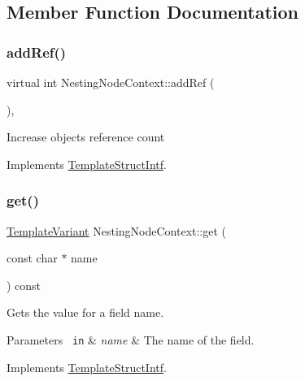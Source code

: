 \subsection{Member Function Documentation}
\mbox{\label{class_nesting_node_context_a4cd533625e9feace6c41d8191da089c4}} 
\subsubsection{\texorpdfstring{addRef()}{addRef()}}
{\footnotesize\ttfamily virtual int Nesting\+Node\+Context\+::add\+Ref (\begin{DoxyParamCaption}{ }\end{DoxyParamCaption})\hspace{0.3cm}{\ttfamily [inline]}, {\ttfamily [virtual]}}

Increase object\textquotesingle{}s reference count 

Implements \mbox{\hyperlink{class_template_struct_intf_a05fe97ad47633beb326f69686faed581}{Template\+Struct\+Intf}}.

\mbox{\label{class_nesting_node_context_a7845a1aab178cdb02172738a864854ce}} 
\subsubsection{\texorpdfstring{get()}{get()}}
{\footnotesize\ttfamily \mbox{\hyperlink{class_template_variant}{Template\+Variant}} Nesting\+Node\+Context\+::get (\begin{DoxyParamCaption}\item[{const char $\ast$}]{name }\end{DoxyParamCaption}) const\hspace{0.3cm}{\ttfamily [virtual]}}

Gets the value for a field name. 
\begin{DoxyParams}[1]{Parameters}
\mbox{\texttt{ in}}  & {\em name} & The name of the field. \\
\hline
\end{DoxyParams}


Implements \mbox{\hyperlink{class_template_struct_intf_a3d610cb81b4adbb531ebed3aa3d09b51}{Template\+Struct\+Intf}}.

